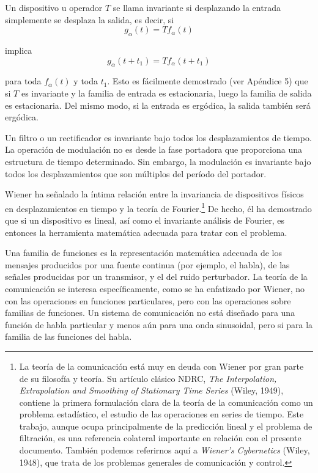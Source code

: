 Un dispositivo u operador $T$ se llama invariante si desplazando la entrada
simplemente se desplaza la salida, es decir, si
\begin{equation}
  g_{\alpha}(t) = Tf_{\alpha}(t)
\end{equation}

implica
\begin{equation}
  g_{\alpha}(t+t_1) = Tf_{\alpha}(t+t_1)
\end{equation}

para toda $f_{\alpha}(t)$ y toda $t_1$. Esto es f\'acilmente demostrado (ver
Ap\'endice 5) que si $T$ es invariante y la familia de entrada es estacionaria,
luego la familia de salida es estacionaria. Del mismo modo, si la entrada es
erg\'odica, la salida tambi\'en ser\'a erg\'odica.

Un filtro o un rectificador es invariante bajo todos los desplazamientos de
tiempo. La operaci\'on de modulaci\'on no es desde la fase portadora que
proporciona una estructura de tiempo determinado. Sin embargo, la modulaci\'on
es invariante bajo todos los desplazamientos que son m\'ultiplos del per\'iodo
del portador.

Wiener ha se\~nalado la \'intima relaci\'on entre la invariancia de dispositivos
f\'isicos en desplazamientos en tiempo y la teor\'ia de Fourier.\footnote[4]{La
teor\'ia de la comunicaci\'on est\'a muy en deuda con Wiener por gran parte de
su filosof\'ia y teor\'ia. Su art\'iculo cl\'asico NDRC, {\em The Interpolation,
Extrapolation and Smoothing of Stationary Time Series} (Wiley, 1949), contiene
la primera formulaci\'on clara de la teor\'ia de la comunicaci\'on como un
problema estad\'istico, el estudio de las operaciones en series de tiempo. Este
trabajo, aunque ocupa principalmente de la predicci\'on lineal y el problema de
filtraci\'on, es una referencia colateral importante en relaci\'on con el
presente documento. Tambi\'en podemos referirnos aqu\'i a {\em Wiener's
Cybernetics} (Wiley, 1948), que trata de los problemas generales de
comunicaci\'on y control.} De hecho, \'el ha demostrado que si un dispositivo es
lineal, as\'i como el invariante an\'alisis de Fourier, es entonces la
herramienta matem\'atica adecuada para tratar con el problema.

Una familia de funciones es la representaci\'on matem\'atica adecuada de los
mensajes producidos por una fuente continua (por ejemplo, el habla), de las
se\~nales producidas por un transmisor, y el del ruido perturbador. La teor\'ia
de la comunicaci\'on se interesa espec\'ificamente, como se ha enfatizado por
Wiener, no con las operaciones en funciones particulares, pero con las
operaciones sobre familias de funciones. Un sistema de comunicaci\'on no
est\'a dise\~nado para una funci\'on de habla particular y menos a\'un para una
onda sinusoidal, pero si para la familia de las funciones del habla.
\newline

